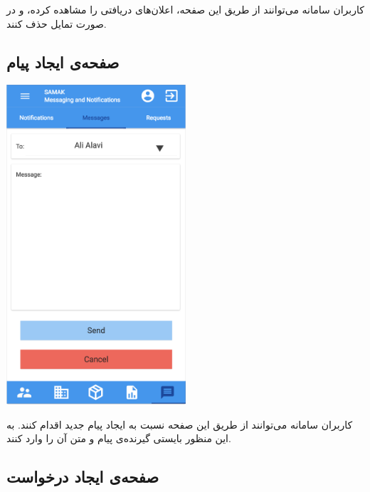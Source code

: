 کاربران سامانه می‌توانند از طریق این صفحه، اعلان‌های دریافتی را مشاهده کرده،  و در صورت تمایل حذف کنند.



\subsection{صفحه‌ی ایجاد پیام}

\begin{center}
\includegraphics[width = 0.5\textwidth]{images/20-reply-delete.png}
\end{center}

کاربران سامانه می‌توانند از طریق این صفحه نسبت به ایجاد پیام جدید اقدام کنند. به این منظور بایستی گیرنده‌ی پیام و متن آن را وارد کنند.


\subsection{صفحه‌ی ایجاد درخواست}

